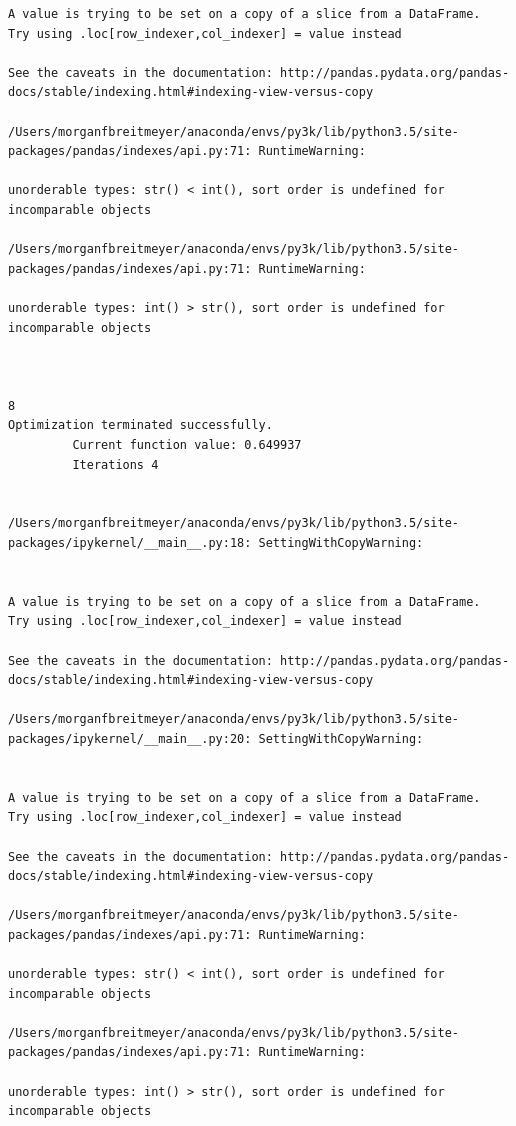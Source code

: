 \begin{lstlisting}
A value is trying to be set on a copy of a slice from a DataFrame.
Try using .loc[row_indexer,col_indexer] = value instead

See the caveats in the documentation: http://pandas.pydata.org/pandas-docs/stable/indexing.html#indexing-view-versus-copy

/Users/morganfbreitmeyer/anaconda/envs/py3k/lib/python3.5/site-packages/pandas/indexes/api.py:71: RuntimeWarning:

unorderable types: str() < int(), sort order is undefined for incomparable objects

/Users/morganfbreitmeyer/anaconda/envs/py3k/lib/python3.5/site-packages/pandas/indexes/api.py:71: RuntimeWarning:

unorderable types: int() > str(), sort order is undefined for incomparable objects



8
Optimization terminated successfully.
         Current function value: 0.649937
         Iterations 4


/Users/morganfbreitmeyer/anaconda/envs/py3k/lib/python3.5/site-packages/ipykernel/__main__.py:18: SettingWithCopyWarning:


A value is trying to be set on a copy of a slice from a DataFrame.
Try using .loc[row_indexer,col_indexer] = value instead

See the caveats in the documentation: http://pandas.pydata.org/pandas-docs/stable/indexing.html#indexing-view-versus-copy

/Users/morganfbreitmeyer/anaconda/envs/py3k/lib/python3.5/site-packages/ipykernel/__main__.py:20: SettingWithCopyWarning:


A value is trying to be set on a copy of a slice from a DataFrame.
Try using .loc[row_indexer,col_indexer] = value instead

See the caveats in the documentation: http://pandas.pydata.org/pandas-docs/stable/indexing.html#indexing-view-versus-copy

/Users/morganfbreitmeyer/anaconda/envs/py3k/lib/python3.5/site-packages/pandas/indexes/api.py:71: RuntimeWarning:

unorderable types: str() < int(), sort order is undefined for incomparable objects

/Users/morganfbreitmeyer/anaconda/envs/py3k/lib/python3.5/site-packages/pandas/indexes/api.py:71: RuntimeWarning:

unorderable types: int() > str(), sort order is undefined for incomparable objects




\end{lstlisting}
